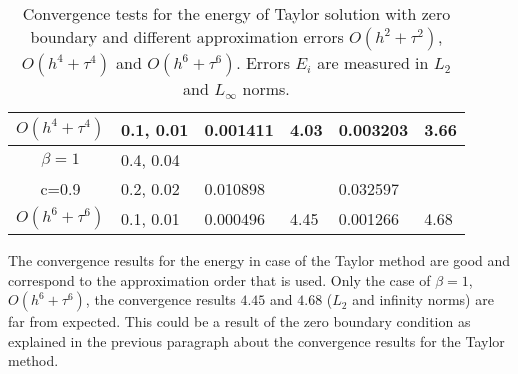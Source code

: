 \documentclass[%
 aip,
cp,  %
 amsmath,amssymb,%
 reprint,%
]{revtex4-2}
\begin{document}
\begin{table}[ht]
\begin{tabular}{||c|l|ll|ll||}
       $O(h^4+ \tau^4)$ &0.1, 0.01   &0.001411 & 4.03   & 0.003203  & 3.66  \\
    \hline
  $\beta=1$     &0.4, 0.04   &            &          &                  &      \\
      c=0.9                    &0.2, 0.02   &0.010898 &           & 0.032597      &       \\
     $O(h^6+ \tau^6)$ &0.1, 0.01 & 0.000496 &4.45 & 0.001266  & 4.68        \\
	   \hline
			\hline 
		\end{tabular}
		\caption{Convergence tests for the energy of Taylor solution with zero boundary and different approximation errors $O(h^{2} + \tau^2 )$, $O(h^{4} + \tau^4 )$ and $O(h^{6} + \tau^6 )$. Errors $E_i$ are measured in $L_2$ and $L_\infty$ norms.}
\label{tableB}
\end{table}
 
The convergence results for the energy in case of the Taylor method are good and correspond to the approximation order that is used. Only the case of $\beta = 1$, $O(h^6 + \tau^6)$, the convergence results $4.45$ and $4.68$ ($L_2$ and infinity norms) are far from expected. This could be a result of the zero boundary condition as explained in the previous paragraph about the convergence results for the Taylor method.
\end{document}
